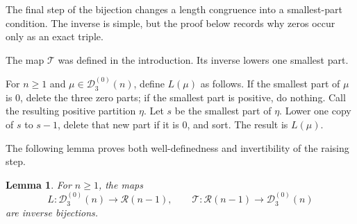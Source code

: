 \documentclass[11pt]{amsart}
\newtheorem{lemma}[theorem]{Lemma}
\theoremstyle{definition}
\theoremstyle{remark}
\newcommand{\D}{\mathcal D}
\newcommand{\R}{\mathcal R}
\begin{document}
The final step of the bijection changes a length congruence into a smallest-part condition.  The inverse is simple, but the proof below records why zeros occur only as an exact triple.

The map $\mathcal T$ was defined in the introduction.  Its inverse lowers one smallest part.

For $n\ge1$ and $\mu\in\D_3^{(0)}(n)$, define $L(\mu)$ as follows.  If the smallest part of $\mu$ is $0$, delete the three zero parts; if the smallest part is positive, do nothing.  Call the resulting positive partition $\eta$.  Let $s$ be the smallest part of $\eta$.  Lower one copy of $s$ to $s-1$, delete that new part if it is $0$, and sort.  The result is $L(\mu)$.

The following lemma proves both well-definedness and invertibility of the raising step.

\begin{lemma}\label{lem:L}
For $n\ge1$, the maps
\[
        L:\D_3^{(0)}(n)\longrightarrow\R(n-1),
        \qquad
        \mathcal T:\R(n-1)\longrightarrow\D_3^{(0)}(n)
\]
are inverse bijections.
\end{lemma}
\end{document}
